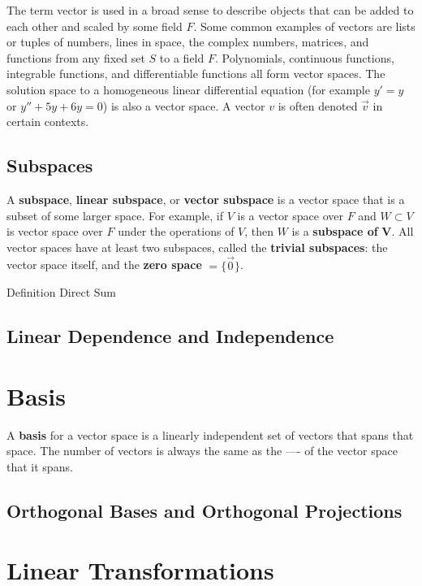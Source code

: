 \documentclass[12pt]{article}
\begin{document}
The term vector is used in a broad sense to describe objects that can be added to each other and scaled by some field $F$. Some common examples of vectors are lists or tuples of numbers, lines in space, the complex numbers, matrices, and functions from any fixed set $S$ to a field $F$. Polynomials, continuous functions, integrable functions, and differentiable functions all form vector spaces. The solution space to a homogeneous linear differential equation (for example $y' = y$ or $y'' + 5y + 6y = 0$) is also a vector space. A vector $v$ is often denoted $\vec{v}$ in certain contexts.

\subsection{Subspaces}

A \textbf{subspace}, \textbf{linear subspace}, or \textbf{vector subspace} is a vector space that is a subset of some larger space. For example, if $V$ is a vector space over $F$ and $W \subset V$ is vector space over $F$ under the operations of $V$, then $W$ is a \textbf{subspace of} $\mathbf{V}$. All vector spaces have at least two subspaces, called the \textbf{trivial subspaces}: the vector space itself, and the \textbf{zero space} $= \{ \vec{0} \}$.

Definition Direct Sum

\subsection{Linear Dependence and Independence}

\section{Basis}

A \textbf{basis} for a vector space is a linearly independent set of vectors that spans that space. The number of vectors is always the same as the ---- of the vector space that it spans.

\subsection{Orthogonal Bases and Orthogonal Projections}

\section{Linear Transformations}
\end{document}
